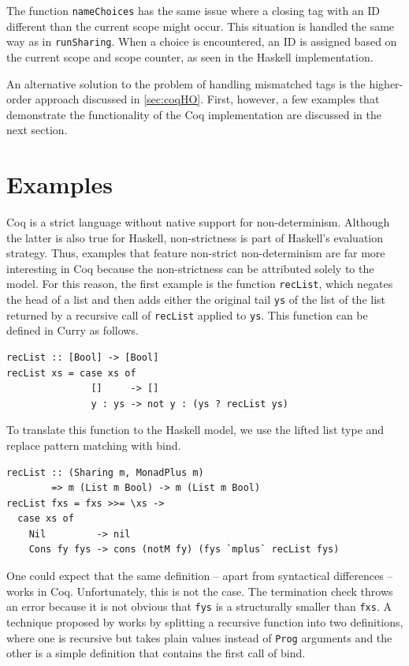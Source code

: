 \documentclass[a4paper, 11pt, fleqn, twoside]{scrreprt}
\newcommand{\hinl}[1]{\texttt{#1}}
\newcommand{\cinl}[1]{\texttt{#1}}
\begin{document}
The function \cinl{nameChoices} has the same issue where a closing tag with an ID different than the current scope might occur.
This situation is handled the same way as in \cinl{runSharing}.
When a choice is encountered, an ID is assigned based on the current scope and scope counter, as seen in the Haskell implementation.

An alternative solution to the problem of handling mismatched tags is the higher-order approach discussed in \autoref{sec:coqHO}.
First, however, a few examples that demonstrate the functionality of the Coq implementation are discussed in the next section.

\section{Examples}
Coq is a strict language without native support for non-determinism.
Although the latter is also true for Haskell, non-strictness is part of Haskell's evaluation strategy.
Thus, examples that feature non-strict non-determinism are far more interesting in Coq because the non-strictness can be attributed solely to the model.
For this reason, the first example is the function \hinl{recList}, which negates the head of a list and then adds either the original tail \hinl{ys} of the list of the list returned by a recursive call of \hinl{recList} applied to \hinl{ys}.
This function can be defined in Curry as follows. 

\begin{verbatim}
recList :: [Bool] -> [Bool]
recList xs = case xs of
               []     -> []
               y : ys -> not y : (ys ? recList ys)
\end{verbatim}

To translate this function to the Haskell model, we use the lifted list type and replace pattern matching with bind.

\begin{verbatim}
recList :: (Sharing m, MonadPlus m) 
        => m (List m Bool) -> m (List m Bool)
recList fxs = fxs >>= \xs ->
  case xs of
    Nil         -> nil
    Cons fy fys -> cons (notM fy) (fys `mplus` recList fys)
\end{verbatim}

One could expect that the same definition -- apart from syntactical differences -- works in Coq.
Unfortunately, this is not the case.
The termination check throws an error because it is not obvious that \hinl{fys} is a structurally smaller than \hinl{fxs}.
A technique proposed by \citet{christiansen2018oneMonad} works by splitting a recursive function into two definitions, where one is recursive but takes plain values instead of \cinl{Prog} arguments and the other is a simple definition that contains the first call of bind.
\end{document}
